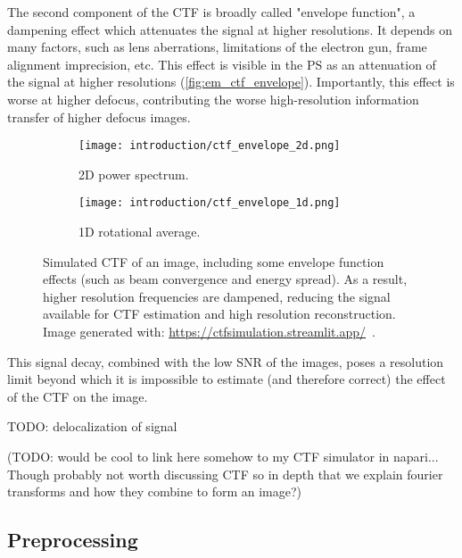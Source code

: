 The second component of the CTF is broadly called "envelope function", a dampening effect which attenuates the signal at higher resolutions.
It depends on many factors, such as lens aberrations, limitations of the electron gun, frame alignment imprecision, etc.
This effect is visible in the PS as an attenuation of the signal at higher resolutions (\autoref{fig:em_ctf_envelope}).
Importantly, this effect is worse at higher defocus, contributing the worse high-resolution information transfer of higher defocus images.

\begin{figure}[ht]
    \centering
    \begin{subfigure}[B]{.42\textwidth}
        \centering
        \texttt{[image: introduction/ctf\_envelope\_2d.png]}
        \caption{2D power spectrum.}
        \label{fig:em_ctf_envelope_2d}
    \end{subfigure}%
    \hfill
    \begin{subfigure}[B]{.55\textwidth}
        \centering
        \texttt{[image: introduction/ctf\_envelope\_1d.png]}
        \caption{1D rotational average.}
        \label{fig:em_ctf_envelope_1d}
    \end{subfigure}%
    \caption[CTF: effect of the envelope function]{Simulated CTF of an image, including some envelope function effects (such as beam convergence and energy spread). As a result, higher resolution frequencies are dampened, reducing the signal available for CTF estimation and high resolution reconstruction. Image generated with: \url{https://ctfsimulation.streamlit.app/}~\cite{jiangWebbasedSimulationContrast2001}.}
    \label{fig:em_ctf_envelope}
\end{figure}

This signal decay, combined with the low SNR of the images, poses a resolution limit beyond which it is impossible to estimate (and therefore correct) the effect of the CTF on the image.

TODO: delocalization of signal

(TODO: would be cool to link here somehow to my CTF simulator in napari... Though probably not worth discussing CTF so in depth that we explain fourier transforms and how they combine to form an image?)

\subsection{Preprocessing}

